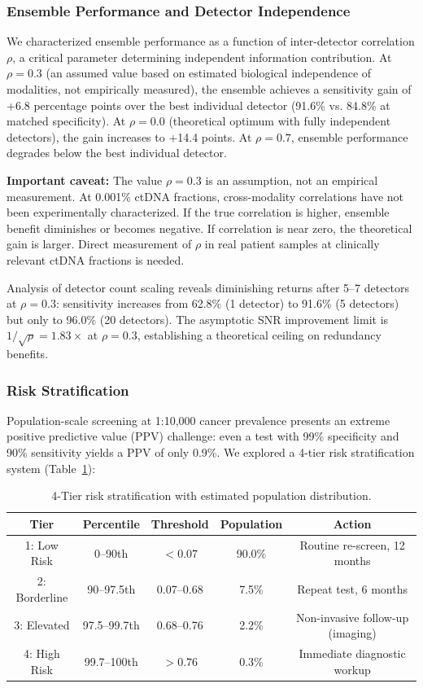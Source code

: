 \documentclass[10pt,a4paper]{article}
\begin{document}
\subsubsection{Ensemble Performance and Detector Independence}

We characterized ensemble performance as a function of inter-detector correlation $\rho$, a critical parameter determining independent information contribution. At $\rho = 0.3$ (an assumed value based on estimated biological independence of modalities, not empirically measured), the ensemble achieves a sensitivity gain of +6.8 percentage points over the best individual detector (91.6\% vs. 84.8\% at matched specificity). At $\rho = 0.0$ (theoretical optimum with fully independent detectors), the gain increases to +14.4 points. At $\rho = 0.7$, ensemble performance degrades below the best individual detector.

\textbf{Important caveat:} The value $\rho = 0.3$ is an assumption, not an empirical measurement. At 0.001\% ctDNA fractions, cross-modality correlations have not been experimentally characterized. If the true correlation is higher, ensemble benefit diminishes or becomes negative. If correlation is near zero, the theoretical gain is larger. Direct measurement of $\rho$ in real patient samples at clinically relevant ctDNA fractions is needed.

Analysis of detector count scaling reveals diminishing returns after 5--7 detectors at $\rho = 0.3$: sensitivity increases from 62.8\% (1 detector) to 91.6\% (5 detectors) but only to 96.0\% (20 detectors). The asymptotic SNR improvement limit is $1/\sqrt{\rho} = 1.83\times$ at $\rho = 0.3$, establishing a theoretical ceiling on redundancy benefits.

\subsubsection{Risk Stratification}

Population-scale screening at 1:10,000 cancer prevalence presents an extreme positive predictive value (PPV) challenge: even a test with 99\% specificity and 90\% sensitivity yields a PPV of only 0.9\%. We explored a 4-tier risk stratification system (Table~\ref{tab:risk_tiers}):

\begin{table}[H]
\centering
\caption{4-Tier risk stratification with estimated population distribution.}
\label{tab:risk_tiers}
\begin{tabular}{c c c c c}
\toprule
\textbf{Tier} & \textbf{Percentile} & \textbf{Threshold} & \textbf{Population} & \textbf{Action} \\
\midrule
1: Low Risk & 0--90th & $<0.07$ & 90.0\% & Routine re-screen, 12 months \\
2: Borderline & 90--97.5th & 0.07--0.68 & 7.5\% & Repeat test, 6 months \\
3: Elevated & 97.5--99.7th & 0.68--0.76 & 2.2\% & Non-invasive follow-up (imaging) \\
4: High Risk & 99.7--100th & $>0.76$ & 0.3\% & Immediate diagnostic workup \\
\bottomrule
\end{tabular}
\end{table}
\end{document}
